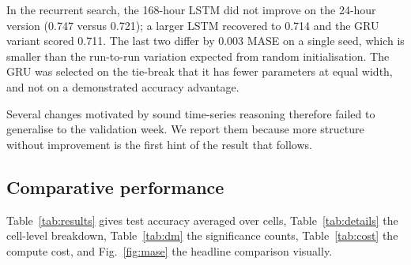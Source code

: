 \documentclass[conference,onecolumn,11pt]{IEEEtran}
\begin{document}
In the recurrent search, the 168-hour LSTM did not improve on the 24-hour version (0.747 versus 0.721); a larger LSTM recovered to 0.714 and the GRU variant scored 0.711. The last two differ by 0.003 MASE on a single seed, which is smaller than the run-to-run variation expected from random initialisation. The GRU was selected on the tie-break that it has fewer parameters at equal width, and not on a demonstrated accuracy advantage.

Several changes motivated by sound time-series reasoning therefore failed to generalise to the validation week. We report them because more structure without improvement is the first hint of the result that follows.

\subsection{Comparative performance}
Table~\ref{tab:results} gives test accuracy averaged over cells, Table~\ref{tab:details} the cell-level breakdown, Table~\ref{tab:dm} the significance counts, Table~\ref{tab:cost} the compute cost, and Fig.~\ref{fig:mase} the headline comparison visually.

\begin{table}[t]
\centering\caption{Test-set accuracy (22 Dec -- 1 Jan), mean over the selected cells. MASE $<1$ beats the 24-hour seasonal naive on the training scale.}\label{tab:results}
\footnotesize
{}
\end{table}

\begin{table}[t]
\centering\caption{Test MASE by cell and horizon (best in bold; SN-24 and SN-168 are the 24-hour and 168-hour seasonal naives).}\label{tab:details}
\footnotesize\setlength{\tabcolsep}{5pt}
\end{table}

\begin{table}[t]
\centering\caption{Diebold--Mariano outcomes against the 24-hour seasonal naive ($p<0.05$), over 21 cell-horizon comparisons per model. At $h=24$ the naive and SN-24 forecasts coincide by construction ($y_{t+24-24}=y_t$), so their loss differential is identically zero and the test is undefined; those seven comparisons are excluded and not counted as ties.}\label{tab:dm}
\footnotesize
{}
\end{table}
\end{document}
